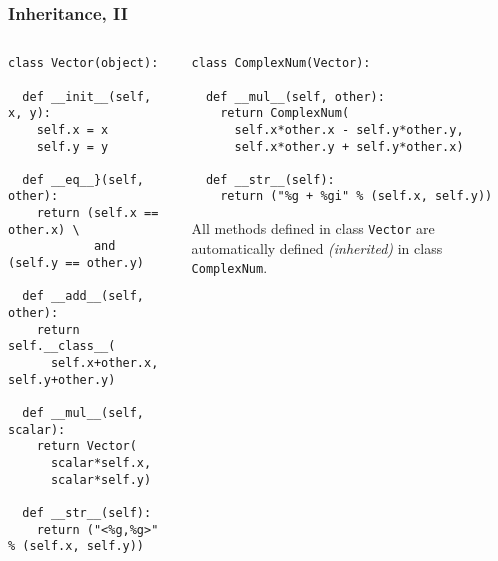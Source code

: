 \begin{frame}[fragile]\frametitle{Inheritance, II}

  \begin{columns}[t]
    \begin{column}{0.5\linewidth}
\begin{lstlisting}[basicstyle=\tiny\ttfamily,showstringspaces=false]
class Vector(object):

  def __init__(self, x, y):
    self.x = x
    self.y = y

  def __eq__}(self, other):
    return (self.x == other.x) \
            and (self.y == other.y)

  def __add__(self, other):
    return self.__class__(
      self.x+other.x, self.y+other.y)

  def __mul__(self, scalar):
    return Vector(
      scalar*self.x,
      scalar*self.y)

  def __str__(self):
    return ("<%g,%g>" % (self.x, self.y))
\end{lstlisting}
    \end{column}
    \begin{column}{0.5\linewidth}
\begin{lstlisting}[basicstyle=\tiny\ttfamily,showstringspaces=false]
class ComplexNum(Vector):

  def __mul__(self, other):
    return ComplexNum(
      self.x*other.x - self.y*other.y,
      self.x*other.y + self.y*other.x)

  def __str__(self):
    return ("%g + %gi" % (self.x, self.y))
\end{lstlisting}

  All methods defined in class \texttt{Vector} are automatically
  defined \emph{(inherited)} in class \texttt{ComplexNum}.
    \end{column}
  \end{columns}
\end{frame}


